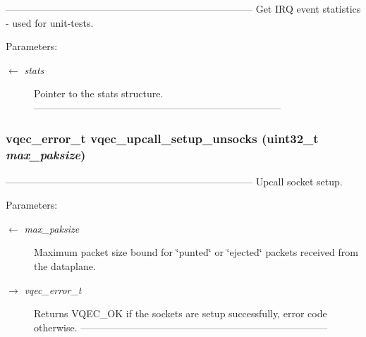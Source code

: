 --------------------------------------------------------------------------- Get IRQ event statistics - used for unit-tests.

\begin{Desc}
\item[Parameters:]
\begin{description}
\item[\mbox{$\leftarrow$} {\em stats}]Pointer to the stats structure. --------------------------------------------------------------------------- \end{description}
\end{Desc}
\subsubsection{\setlength{\rightskip}{0pt plus 5cm}vqec\_\-error\_\-t vqec\_\-upcall\_\-setup\_\-unsocks (uint32\_\-t {\em max\_\-paksize})}\label{vqec__upcall__event_8h_d59208eecf5b3dafa404cf8438b25f66}


--------------------------------------------------------------------------- Upcall socket setup.

\begin{Desc}
\item[Parameters:]
\begin{description}
\item[\mbox{$\leftarrow$} {\em max\_\-paksize}]Maximum packet size bound for \char`\"{}punted\char`\"{} or \char`\"{}ejected\char`\"{} packets received from the dataplane. \item[\mbox{$\rightarrow$} {\em vqec\_\-error\_\-t}]Returns VQEC\_\-OK if the sockets are setup successfully, error code otherwise. --------------------------------------------------------------------------- \end{description}
\end{Desc}
